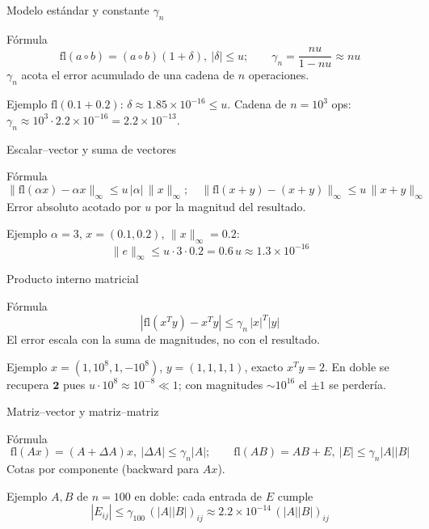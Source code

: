 \documentclass[aspectratio=169,10pt]{beamer}
\begin{document}
\begin{frame}{Modelo estándar y constante $\gamma_n$}
\begin{cardidea}{Fórmula}{\faSuperscript}
\[ \mathrm{fl}(a\circ b)=(a\circ b)(1+\delta),\ |\delta|\le u;\qquad \gamma_n=\frac{nu}{1-nu}\approx nu \]
$\gamma_n$ acota el error acumulado de una cadena de $n$ operaciones.
\end{cardidea}
\vspace{1.5mm}
\begin{cardgear}{Ejemplo}{\faCalculator}
$\mathrm{fl}(0.1+0.2)$: $\delta\approx 1.85\times10^{-16}\le u$.
Cadena de $n=10^{3}$ ops: $\gamma_n\approx 10^{3}\cdot 2.2\times10^{-16}=2.2\times10^{-13}$.
\end{cardgear}
\end{frame}

\begin{frame}{Escalar--vector y suma de vectores}
\begin{cardidea}{Fórmula}{\faSuperscript}
\[ \|\mathrm{fl}(\alpha x)-\alpha x\|_\infty\le u\,|\alpha|\,\|x\|_\infty;\quad \|\mathrm{fl}(x{+}y)-(x{+}y)\|_\infty\le u\,\|x{+}y\|_\infty \]
Error absoluto acotado por $u$ por la magnitud del resultado.
\end{cardidea}
\vspace{1.5mm}
\begin{cardgear}{Ejemplo}{\faCalculator}
$\alpha=3$, $x=(0.1,0.2)$, $\|x\|_\infty=0.2$:
\[ \|e\|_\infty\le u\cdot 3\cdot 0.2=0.6\,u\approx 1.3\times10^{-16} \]
\end{cardgear}
\end{frame}

\begin{frame}{Producto interno matricial}
\begin{cardidea}{Fórmula}{\faSuperscript}
\[ |\mathrm{fl}(x^Ty)-x^Ty|\le \gamma_n\,|x|^T|y| \]
El error escala con la suma de magnitudes, no con el resultado.
\end{cardidea}
\vspace{1.5mm}
\begin{cardgear}{Ejemplo}{\faCalculator}
$x=(1,10^{8},1,-10^{8})$, $y=(1,1,1,1)$, exacto $x^Ty=2$.
En doble se recupera $\mathbf{2}$ pues $u\cdot 10^{8}\approx10^{-8}\ll1$; con magnitudes $\sim10^{16}$ el $\pm1$ se perdería.
\end{cardgear}
\end{frame}

\begin{frame}{Matriz--vector y matriz--matriz}
\begin{cardidea}{Fórmula}{\faSuperscript}
\[ \mathrm{fl}(Ax)=(A+\Delta A)x,\ |\Delta A|\le\gamma_n|A|;\qquad \mathrm{fl}(AB)=AB+E,\ |E|\le\gamma_n|A||B| \]
Cotas por componente (backward para $Ax$).
\end{cardidea}
\vspace{1.5mm}
\begin{cardgear}{Ejemplo}{\faCalculator}
$A,B$ de $n=100$ en doble: cada entrada de $E$ cumple
\[ |E_{ij}|\le\gamma_{100}\,(|A||B|)_{ij}\approx 2.2\times10^{-14}\,(|A||B|)_{ij} \]
\end{cardgear}
\end{frame}
\end{document}
